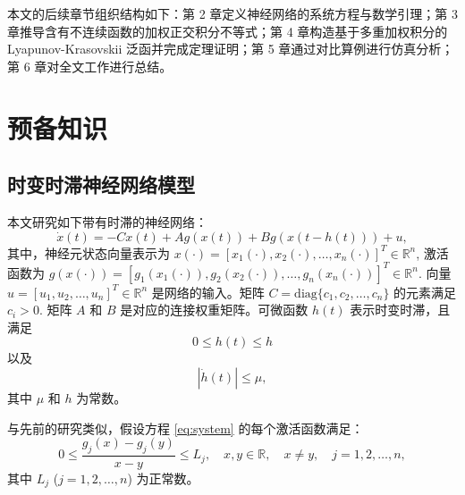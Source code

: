 \documentclass[a4paper, 12pt, oneside]{article}
\theoremstyle{cn_theorem}
\begin{document}
本文的后续章节组织结构如下：第 2 章定义神经网络的系统方程与数学引理；第 3 章推导含有不连续函数的加权正交积分不等式；第 4 章构造基于多重加权积分的 Lyapunov-Krasovskii 泛函并完成定理证明；第 5 章通过对比算例进行仿真分析；第 6 章对全文工作进行总结。

\section{预备知识}
\subsection{时变时滞神经网络模型}
本文研究如下带有时滞的神经网络：
\begin{equation} \label{eq:system}
    \dot{x}(t) = -C x(t) + A g(x(t)) + B g(x(t-h(t))) + u,
\end{equation}
其中，神经元状态向量表示为 $x(\cdot) = [x_1(\cdot), x_2(\cdot), \dots, x_n(\cdot)]^T \in \mathbb{R}^n$, 激活函数为 $g(x(\cdot)) = [g_1(x_1(\cdot)), g_2(x_2(\cdot)), \dots, g_n(x_n(\cdot))]^T \in \mathbb{R}^n$. 向量 $u = [u_1, u_2, \dots, u_n]^T \in \mathbb{R}^n$ 是网络的输入。矩阵 $C = \mathrm{diag}\{c_1, c_2, \dots, c_n\}$ 的元素满足 $c_i > 0$. 矩阵 $A$ 和 $B$ 是对应的连接权重矩阵。可微函数 $h(t)$ 表示时变时滞，且满足
\begin{equation}
    0 \le h(t) \le h
\end{equation}
以及
\begin{equation}
    |\dot{h}(t)| \le \mu,
\end{equation}
其中 $\mu$ 和 $h$ 为常数。

与先前的研究类似，假设方程 \eqref{eq:system} 的每个激活函数满足：
\begin{equation} \label{eq:lipschitz_g}
    0 \le \frac{g_j(x) - g_j(y)}{x - y} \le L_j, \quad x, y \in \mathbb{R}, \quad x \neq y, \quad j=1,2,\dots,n,
\end{equation}
其中 $L_j$ ($j=1,2,\dots,n$) 为正常数。
\end{document}
